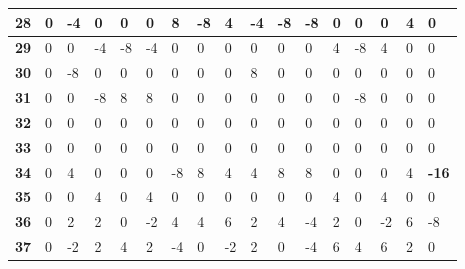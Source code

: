 \begin{longtable}[c]{|l|l|l|l|l|l|l|l|l|l|l|l|l|l|l|l|l|}
\textbf{28} & 0          & -4         & 0          & 0          & 0          & 8          & -8         & 4          & -4         & -8         & -8          & 0           & 0           & 0           & 4           & 0           \\ \hline
\textbf{29} & 0          & 0          & -4         & -8         & -4         & 0          & 0          & 0          & 0          & 0          & 0           & 4           & -8          & 4           & 0           & 0           \\ \hline
\textbf{30} & 0          & -8         & 0          & 0          & 0          & 0          & 0          & 0          & 8          & 0          & 0           & 0           & 0           & 0           & 0           & 0           \\ \hline
\textbf{31} & 0          & 0          & -8         & 8          & 8          & 0          & 0          & 0          & 0          & 0          & 0           & 0           & -8          & 0           & 0           & 0           \\ \hline
\textbf{32} & 0          & 0          & 0          & 0          & 0          & 0          & 0          & 0          & 0          & 0          & 0           & 0           & 0           & 0           & 0           & 0           \\ \hline
\textbf{33} & 0          & 0          & 0          & 0          & 0          & 0          & 0          & 0          & 0          & 0          & 0           & 0           & 0           & 0           & 0           & 0           \\ \hline
\textbf{34} & 0          & 4          & 0          & 0          & 0          & -8         & 8          & 4          & 4          & 8          & 8           & 0           & 0           & 0           & 4           & \textbf{-16}         \\ \hline
\textbf{35} & 0          & 0          & 4          & 0          & 4          & 0          & 0          & 0          & 0          & 0          & 0           & 4           & 0           & 4           & 0           & 0           \\ \hline
\textbf{36} & 0          & 2          & 2          & 0          & -2         & 4          & 4          & 6          & 2          & 4          & -4          & 2           & 0           & -2          & 6           & -8          \\ \hline
\textbf{37} & 0          & -2         & 2          & 4          & 2          & -4         & 0          & -2         & 2          & 0          & -4          & 6           & 4           & 6           & 2           & 0           \\ \hline

\end{longtable}
